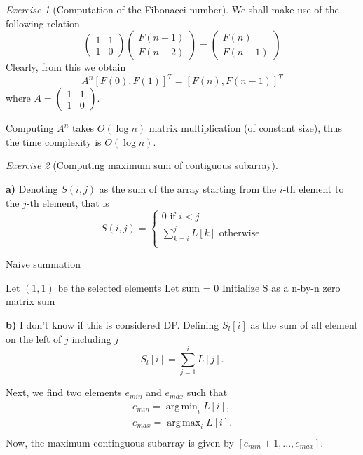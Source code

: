 \documentclass[a4paper,10pt,twoside]{article}
\DeclareMathOperator*{\argmin}{arg\,min}
\DeclareMathOperator*{\argmax}{arg\,max}
\theoremstyle{plain}
\theoremstyle{definition}
\theoremstyle{remark}
\newtheorem{exercise}{Exercise}
\begin{document}
\begin{exercise}[Computation of the Fibonacci number]
We shall make use of the following relation
\begin{equation}
	\begin{pmatrix}
		1 & 1\\ 1 & 0
	\end{pmatrix}
	\begin{pmatrix}F(n-1)\\F(n-2)\end{pmatrix}
	= \begin{pmatrix}F(n)\\F(n-1)\end{pmatrix}
\end{equation}
Clearly, from this we obtain
\begin{equation}
	A^n [F(0), F(1)]^T = [F(n), F(n-1)]^T
\end{equation}
where $A = \begin{pmatrix}1 & 1\\ 1 & 0\end{pmatrix}$.

Computing $A^n$ takes $O(\log n)$ matrix multiplication (of constant
size), thus the time complexity is $O(\log n)$.
\end{exercise}
\begin{exercise}[Computing maximum sum of contiguous subarray]\

\textbf{a)} Denoting $S(i, j)$ as the sum of the array starting
from the $i$-th element to the $j$-th element, that is
\[
	S(i, j) = \begin{cases}
		0 \text{ if $i < j$}\\
		\sum_{k=i}^j L[k] \text{ otherwise}\\
	\end{cases}
\]
\begin{algorithm}[H]
	\caption{Naive summation}
	Let $(1, 1)$ be the selected elements\;
	Let sum = 0\;
	Initialize S as a n-by-n zero matrix\;
	\Return sum
\end{algorithm}
\textbf{b)} I don't know if this is considered DP. Defining $S_l[i]$
as the sum of all element on the left of $j$ including $j$
\[
	S_l[i] = \sum_{j=1}^i L[j].
\]
\end{exercise}

Next, we find two elements $e_{min}$ and $e_{max}$ such that
\[
\begin{aligned}
	e_{min} = \argmin_i L[i],\\
	e_{max} = \argmax_i L[i].\\
\end{aligned}
\]
Now, the maximum continguous subarray is given by $[e_{min}+1,...,e_{max}]$.
\end{document}
